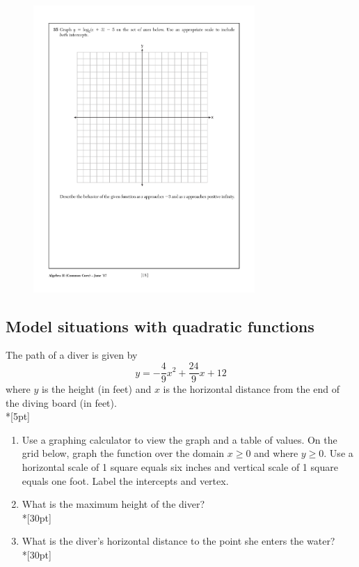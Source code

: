 \documentclass[]{book}
\begin{document}
\begin{enumerate}
\begin{figure}[!ht]
    \centering
    \includegraphics[width=0.75\textwidth]{regents-grid.pdf}
\end{figure}

\newpage
\subsection*{Model situations with quadratic functions}

The path of a diver is given by 
\[y=-\frac{4}{9}x^2+\frac{24}{9}x+12\]
where $y$ is the height (in feet) and $x$ is the horizontal distance from the end of the diving board (in feet).\\*[5pt]
\begin{enumerate}
    \item Use a graphing calculator to view the graph and a table of values. On the grid below, graph the function over the domain $x \geq 0$ and where $y \geq 0$. Use a horizontal scale of 1 square equals six inches and vertical scale of 1 square equals one foot. Label the intercepts and vertex.
    \item What is the maximum height of the diver?\\*[30pt]
    \item What is the diver's horizontal distance to the point she enters the water?\\*[30pt]
\end{enumerate}


\end{enumerate}
\end{document}
